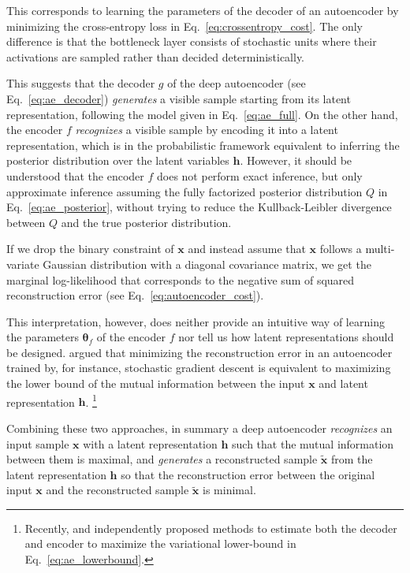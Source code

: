 \documentclass{now}
\newcommand{\vect}[1]{\mathbf{#1}}
\newcommand{\vects}[1]{\boldsymbol{#1}}
\newcommand{\vh}[0]{\vect{h}}
\newcommand{\vx}[0]{\vect{x}}
\newcommand{\TT}[0]{{\vects{\theta}}}
\begin{document}
This corresponds to learning the parameters of the decoder of an autoencoder by
minimizing the cross-entropy loss in Eq.~\eqref{eq:crossentropy_cost}.  The only
difference is that the bottleneck layer consists of stochastic units where their
activations are sampled rather than decided deterministically. 

This suggests that the decoder $g$ of the deep autoencoder (see
Eq.~\eqref{eq:ae_decoder}) \textit{generates} a visible sample starting from its
latent representation, following the model given in Eq.~\eqref{eq:ae_full}. On
the other hand, the encoder $f$ \textit{recognizes} a visible sample by encoding
it into a latent representation, which is in the probabilistic framework
equivalent to inferring the posterior distribution over the latent variables
$\vh$.  However, it should be understood that the encoder $f$ does not perform
exact inference, but only approximate inference assuming the fully factorized
posterior distribution $Q$ in Eq.~\eqref{eq:ae_posterior}, without trying to
reduce the Kullback-Leibler divergence between $Q$ and the true posterior
distribution.

If we drop the binary constraint of $\vx$ and instead assume that $\vx$ follows
a multi-variate Gaussian distribution with a diagonal covariance matrix, we get
the marginal log-likelihood that corresponds to the negative sum of squared
reconstruction error (see Eq.~\eqref{eq:autoencoder_cost}).

This interpretation, however, does neither provide an intuitive way of learning
the parameters $\TT_f$ of the encoder $f$ nor tell us how latent representations
should be designed.  \citet{Vincent2010} argued that minimizing the
reconstruction error in an autoencoder trained by, for instance, stochastic
gradient descent is equivalent to maximizing the lower bound of the mutual
information between the input $\vx$ and latent representation $\vh$.
\footnote{
    Recently, \citet{Kingma2014} and \citet{Mnih2014} independently proposed
    methods to estimate both the decoder and encoder to maximize the variational
    lower-bound in Eq.~\eqref{eq:ae_lowerbound}.
}

Combining these two approaches, in summary a deep autoencoder
\textit{recognizes} an input sample $\vx$ with a latent representation $\vh$
such that the mutual information between them is maximal, and \textit{generates}
a reconstructed sample $\tilde{\vx}$ from the latent representation $\vh$ so
that the reconstruction error between the original input $\vx$ and the
reconstructed sample $\tilde{\vx}$ is minimal.
\end{document}
